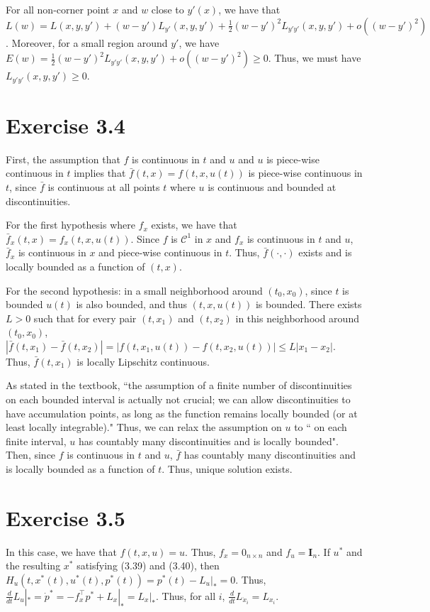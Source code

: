 \documentclass[11pt]{report}
\newcommand{\T}{\intercal}
\begin{document}
For all non-corner point $x$ and $w$ close to $y'(x)$, we have that $L(w) = L(x,y,y')+(w-y')L_{y'}(x,y,y')+\frac{1}{2}(w-y')^2L_{y'y'}(x,y,y')+o((w-y')^2)$. Moreover, for a small region around $y'$, we have $E(w) = \frac{1}{2}(w-y')^2L_{y'y'}(x,y,y')+o((w-y')^2) \geq 0$. Thus, we must have $L_{y'y'}(x,y,y') \geq 0$.

\section*{Exercise 3.4}
First, the assumption that $f$ is continuous in $t$ and $u$ and $u$ is piece-wise continuous in $t$ implies that $\bar{f}(t,x) = f(t,x,u(t))$ is piece-wise continuous in $t$, since $\bar{f}$ is continuous at all points $t$ where $u$ is continuous and bounded at discontinuities.

For the first hypothesis where $f_x$ exists, we have that $\bar{f}_x(t,x) = f_x(t,x,u(t))$. Since $f$ is $\mathcal{C}^1$ in $x$ and $f_x$ is continuous in $t$ and $u$, $\bar{f}_x$ is continuous in $x$ and piece-wise continuous in $t$. Thus, $\bar{f}(\cdot,\cdot)$ exists and is locally bounded as a function of $(t,x)$.

For the second hypothesis: in a small neighborhood around $(t_0, x_0)$, since $t$ is bounded $u(t)$ is also bounded, and thus $(t, x, u(t))$ is bounded. There exists $L>0$ such that for every pair $(t, x_1)$ and $(t, x_2)$ in this neighborhood around $(t_0, x_0)$, $|\bar{f}(t,x_1) - \bar{f}(t,x_2)| = |f(t,x_1,u(t)) - f(t,x_2,u(t))| \leq L|x_1 - x_2|$. Thus, $\bar{f}(t,x_1)$ is locally Lipschitz continuous.

As stated in the textbook, ``the assumption of a finite number of discontinuities on each bounded interval is actually not crucial; we can allow discontinuities to have accumulation points, as long as the function remains locally bounded (or at least locally integrable)." Thus, we can relax the assumption on $u$ to `` on each finite interval, $u$ has countably many discontinuities and is locally bounded". Then, since $f$ is continuous in $t$ and $u$, $\bar{f}$ has countably many discontinuities and is locally bounded as a function of $t$. Thus, unique solution exists.

\section*{Exercise 3.5}
In this case, we have that $f(t, x, u) = u$. Thus, $f_x = 0_{n \times n}$ and $f_u = \mathbf{I}_n$. If $u^*$ and the resulting $x^*$ satisfying (3.39) and (3.40), then $H_u(t, x^*(t), u^*(t), p^*(t)) = p^*(t) - L_u|_* = 0$. Thus, $\frac{d}{dt}L_u|_* = \dot{p}^* = -f_x^\T p^* + L_x|_* = L_x|_*$. Thus, for all $i$, $\frac{d}{dt}L_{\dot{x}_i} = L_{x_i}$.
\end{document}
